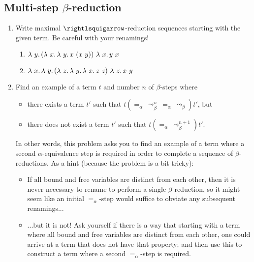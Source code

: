 \subsection{Multi-step $\beta$-reduction}

\begin{enumerate}

\item Write maximal $\curva$-reduction sequences starting with the given term.  Be careful with your renamings!

\begin{enumerate}
\item $\lam{y}{(\lam{x}{\lam{y}{x\ (x\ y)}})\ \lam{x}{y\ x}}$
  \vspace{.5cm}
\item $\lam{x}{\lam{y}{(\lam{z}{\lam{y}{\lam{x}{z\ z}}})\ \lam{z}{x\ y}}}$
  \vspace{.5cm}
\end{enumerate}

\item Find an example of a term $t$ and number $n$ of $\beta$-steps where
  \begin{itemize}
  \item there exists a term $t'$ such that $t (=_\alpha\ \leadsto_\beta^n\ =_\alpha\ \leadsto_\beta) t'$, but
  \item there does not exist a term $t'$ such that $t (=_\alpha\ \leadsto_\beta^{n+1}) t'$.
  \end{itemize}
  \noindent In other words, this problem asks you to find an example of a term where a second $\alpha$-equivalence step is required in order to
  complete a sequence of $\beta$-reductions.  As a hint (because the problem is a bit tricky):
  \begin{itemize}
  \item If all bound and free variables are distinct from each other, then it is never necessary to rename to perform a single $\beta$-reduction, so it might seem like an initial $=_\alpha$-step would suffice to obviate any subsequent renamings... 
    \item ...but it is not! Ask yourself if there is a way that starting with a term where all bound and free variables are distinct from each other, one could arrive at a term that does not have that property; and then use this to construct a term where a second $=_\alpha$-step is required.

  \end{itemize}
\end{enumerate}
